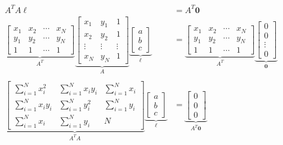 \begin{problem}
\begin{enumroman}
\begin{answer}
        \begin{align*}
          A^T A \ell &= A^T \mathbf{0} \\
          \underbrace{\begin{bmatrix}
            x_1 & x_2 & \cdots & x_N \\
            y_1 & y_2 & \cdots & y_N \\
            1 & 1 & \cdots & 1
          \end{bmatrix}}_{A^T}
          \underbrace{\begin{bmatrix}
            x_1 & y_1 & 1 \\
            x_2 & y_2 & 1 \\
            \vdots & \vdots & \vdots \\
            x_N & y_N & 1
          \end{bmatrix}}_{A}
          \underbrace{\begin{bmatrix}
            a \\
            b \\
            c
          \end{bmatrix}}_{\ell}
          &=
          \underbrace{\begin{bmatrix}
            x_1 & x_2 & \cdots & x_N \\
            y_1 & y_2 & \cdots & y_N \\
            1 & 1 & \cdots & 1
          \end{bmatrix}}_{A^T}
          \underbrace{\begin{bmatrix}
            0 \\
            0 \\
            \vdots \\
            0
          \end{bmatrix}}_{\mathbf{0}} \\ \\
          \underbrace{\begin{bmatrix}
            \sum\limits_{i=1}^N x_i^2 & \sum\limits_{i=1}^N x_i y_i & \sum\limits_{i=1}^N x_i \\
            \sum\limits_{i=1}^N x_i y_i & \sum\limits_{i=1}^N y_i^2 & \sum\limits_{i=1}^N y_i \\
            \sum\limits_{i=1}^N x_i & \sum\limits_{i=1}^N y_i & N
          \end{bmatrix}}_{A^T A}
          \underbrace{\begin{bmatrix}
            a \\
            b \\
            c
          \end{bmatrix}}_{\ell}
          &=
          \underbrace{\begin{bmatrix}
            0 \\
            0 \\
            0
          \end{bmatrix}}_{A^T \mathbf{0}}
        \end{align*}


\end{answer}
\end{enumroman}
\end{problem}
